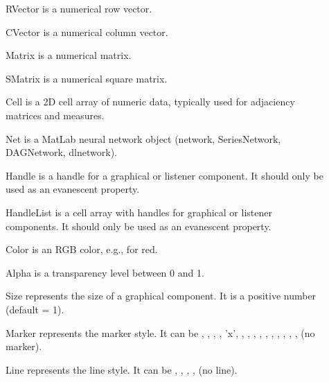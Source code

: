 \documentclass{tufte-handout}
\begin{document}
\begin{fullwidth}
\begin{tcolorbox}[
	title=Property Formats
]
\begin{description}
\item[] RVector is a numerical row vector.
 
\item[] CVector is a numerical column vector.
 
\item[] Matrix is a numerical matrix.
 
\item[] SMatrix is a numerical square matrix.
 
\item[] Cell is a 2D cell array of numeric data, typically used for adjaciency matrices and measures.
 
\item[] Net is a MatLab neural network object (network, SeriesNetwork, DAGNetwork, dlnetwork).
 
\item[] Handle is a handle for a graphical or listener component. It should only be used as an evanescent property.
 
\item[] HandleList is a cell array with handles for graphical or listener components. It should only be used as an evanescent property.
 
\item[] Color is an RGB color, e.g.,  for red.
 
\item[] Alpha is a transparency level between 0 and 1.
 
\item[] Size represents the size of a graphical component. It is a positive number (default = 1).
 
\item[] Marker represents the marker style.
                It can be , , , , 'x', , , , , , , , , , ,  (no marker).
 
\item[] Line represents the line style. It can be , , , ,  (no line).

\end{description}
\end{tcolorbox}
\end{fullwidth}
\end{document}
